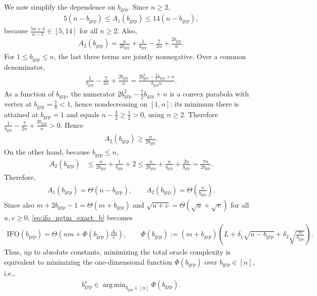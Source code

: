 \documentclass{article}
\DeclareMathOperator*{\argmin}{arg\,min}
\newcommand{\eqdef}{:=}
\theoremstyle{plain}
\begin{document}
We now simplify the dependence on $b_{\mathrm{grp}}$. Since $n\geq 2$,
\begin{align*}
5(n-b_{\mathrm{grp}})\leq A_1(b_{\mathrm{grp}})\leq 14(n-b_{\mathrm{grp}}),
\end{align*}
because $\frac{5n+4}{n-1}\in[5,14]$ for all $n\geq 2$. Also,
\begin{align*}
A_2(b_{\mathrm{grp}})
=
\frac{n}{2b_{\mathrm{grp}}}+\frac{1}{b_{\mathrm{grp}}}-\frac{7}{2n}+\frac{2b_{\mathrm{grp}}}{n}.
\end{align*}
For $1\leq b_{\mathrm{grp}}\leq n$, the last three terms are jointly nonnegative. Over a common denominator,
\begin{align*}
\frac{1}{b_{\mathrm{grp}}}-\frac{7}{2n}+\frac{2b_{\mathrm{grp}}}{n}
=
\frac{2b_{\mathrm{grp}}^2-\frac{7}{2}b_{\mathrm{grp}}+n}{b_{\mathrm{grp}}n}.
\end{align*}
As a function of $b_{\mathrm{grp}}$, the numerator $2b_{\mathrm{grp}}^2-\frac{7}{2}b_{\mathrm{grp}}+n$ is a convex parabola with vertex at $b_{\mathrm{grp}}=\frac{7}{8}<1$, hence nondecreasing on $[1,n]$; its minimum there is attained at $b_{\mathrm{grp}}=1$ and equals $n-\frac{3}{2}\geq\frac{1}{2}>0$, using $n\geq 2$. Therefore $\frac{1}{b_{\mathrm{grp}}}-\frac{7}{2n}+\frac{2b_{\mathrm{grp}}}{n}>0$.
Hence
\begin{align*}
A_2(b_{\mathrm{grp}})\geq \frac{n}{2b_{\mathrm{grp}}}.
\end{align*}
On the other hand, because $b_{\mathrm{grp}}\leq n$,
\begin{align*}
A_2(b_{\mathrm{grp}})
&\leq \frac{n}{2b_{\mathrm{grp}}}+\frac{1}{b_{\mathrm{grp}}}+2
\leq \frac{n}{2b_{\mathrm{grp}}}+\frac{n}{b_{\mathrm{grp}}}+\frac{2n}{b_{\mathrm{grp}}}
= \frac{7n}{2b_{\mathrm{grp}}}.
\end{align*}
Therefore,
\begin{align*}
A_1(b_{\mathrm{grp}})=\Theta(n-b_{\mathrm{grp}}),
\qquad
A_2(b_{\mathrm{grp}})=\Theta\!\left(\frac{n}{b_{\mathrm{grp}}}\right).
\end{align*}
Since also $m+2b_{\mathrm{grp}}-1=\Theta(m+b_{\mathrm{grp}})$ and $\sqrt{u+v}=\Theta(\sqrt{u}+\sqrt{v})$ for all $u,v\geq 0$, \eqref{eq:ifo_ngtm_exact_b} becomes
\begin{align}
\label{eq:ifo_ngtm_simplified_b}
\mathrm{IFO}(b_{\mathrm{grp}})
=
\Theta\left(
nm +
\Phi(b_{\mathrm{grp}})\frac{\Delta_0}{\epsilon}
\right),
\qquad
\Phi(b_{\mathrm{grp}})\eqdef (m+b_{\mathrm{grp}})\left(
L+\delta_1\sqrt{n-b_{\mathrm{grp}}}+\delta_2\sqrt{\frac{n}{b_{\mathrm{grp}}}}
\right).
\end{align}
Thus, up to absolute constants, minimizing the total oracle complexity is equivalent to minimizing the one-dimensional function $\Phi(b_{\mathrm{grp}})$ over $b_{\mathrm{grp}}\in[n]$, i.e.,
\begin{align}
\label{eq:b_star_ngtm}
b_{\mathrm{grp}}^\star \in \argmin_{b_{\mathrm{grp}}\in[n]} \Phi(b_{\mathrm{grp}}).
\end{align}
\end{document}
